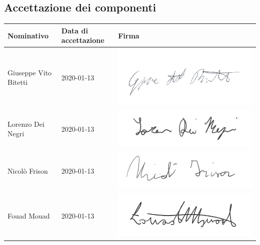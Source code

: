 		\subsection{Accettazione dei componenti}
			
			\begin{table}[H]
				\centering
				\begin{tabular}{|l|l|l|}
					\hline
					\textbf{Nominativo} & \textbf{Data di accettazione} & \textbf{Firma} \\ \hline
					Giuseppe Vito Bitetti & 2020-01-13 & \includegraphics[scale=0.1]{images/firme/peppe} \\ \hline
					Lorenzo Dei Negri & 2020-01-13 & \includegraphics[scale=0.6]{images/firme/lorenzo} \\ \hline
					Nicolò Frison & 2020-01-13 & \includegraphics[scale=0.6]{images/firme/nicolo} \\ \hline
					Fouad Mouad & 2020-01-13 & \includegraphics[scale=0.6]{images/firme/fouad} \\ \hline

\end{tabular}
\end{table}
